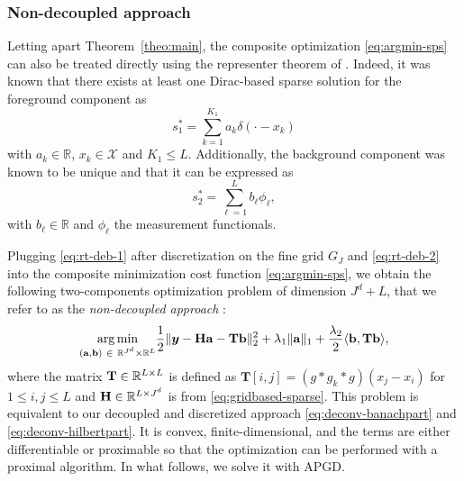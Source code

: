         \subsubsection{Non-decoupled approach}
        Letting apart Theorem~\ref{theo:main}, the composite optimization \eqref{eq:argmin-sps} can also be treated directly using the representer theorem of \cite{debarre2021continuous}. Indeed, it was known that there exists at least one Dirac-based sparse solution for the foreground component as
        \begin{equation}
            s_1^* = \sum_{k=1}^{K_1} a_{k} \delta(\cdot - x_k)
            \label{eq:rt-deb-1}
        \end{equation}
        with $a_{k} \in \mathbb{R}$, $x_k \in \mathcal{X}$ and $K_1 \leq L$.
        Additionally, the background component was known to be unique and that it can be expressed as
        \begin{equation}
            s_2^* = \sum_{\ell=1}^{L} b_{\ell} \phi_\ell,
            \label{eq:rt-deb-2}
        \end{equation}
        with $b_\ell \in \mathbb{R}$ and $\phi_\ell$ the measurement functionals.

        Plugging \eqref{eq:rt-deb-1} after discretization on the fine grid $G_J$ and \eqref{eq:rt-deb-2} into the composite minimization cost function \eqref{eq:argmin-sps}, we obtain the following two-components optimization problem of dimension $J^d + L$, that we refer to as the \emph{non-decoupled approach} :
        \begin{equation}
        \label{eq:ndcp-argmin}
            \underset{(\mathbf{a}, \mathbf{b})\ \in\ \mathbb{R}^{J^d} \times \mathbb{R}^L}{\arg\min} \frac{1}{2} \| \bm{y} - \mathbf{Ha} - \mathbf{Tb} \|_2^2  + \lambda_{1} \| \mathbf{a} \|_1 + \frac{\lambda_{2}}{2} \langle \mathbf{b}, \mathbf{Tb} \rangle,
        \end{equation}
        where the matrix $\mathbf{T} \in \mathbb{R}^{L \times L}$ is defined as
        $\mathbf{T}[i, j] = (g * g_k * g)(x_j - x_i)$ for $1 \leq i, j \leq L$
        and $\mathbf{H} \in \mathbb{R}^{L\times J^d}$ is from \eqref{eq:gridbased-sparse}.
        This problem is equivalent to our decoupled and discretized approach \eqref{eq:deconv-banachpart} and \eqref{eq:deconv-hilbertpart}. It is convex, finite-dimensional, and the terms are either differentiable or proximable so that the optimization can be performed with a proximal algorithm. In what follows, we solve it with APGD. %
    
